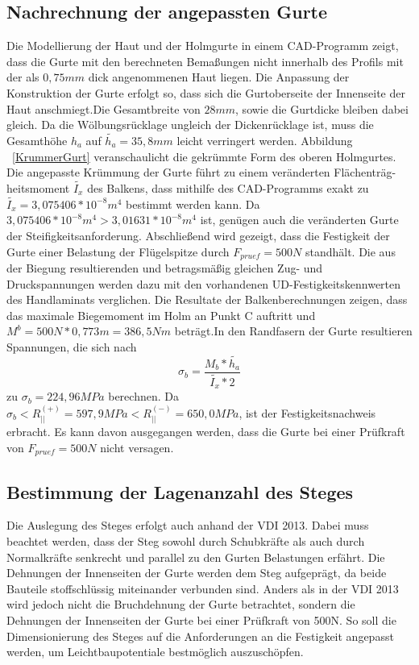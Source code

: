\subsection{Nachrechnung der angepassten Gurte}
 Die Modellierung der Haut und der Holmgurte in einem CAD-Programm zeigt, dass die Gurte mit den berechneten Bemaßungen nicht innerhalb des Profils mit der als $ 0,75mm $ dick angenommenen Haut liegen. Die Anpassung der Konstruktion der Gurte erfolgt so, dass sich die Gurtoberseite der Innenseite der Haut anschmiegt.Die Gesamtbreite von $ 28mm $, sowie die Gurtdicke bleiben dabei gleich. Da die Wölbungsrücklage ungleich der Dickenrücklage ist, muss die Gesamthöhe $ h_{a} $ auf $ \tilde{h_{a}}=35,8mm $ leicht verringert werden. Abbildung ~\ref{KrummerGurt} veranschaulicht die gekrümmte Form des oberen Holmgurtes.\\
 
\noindent Die angepasste Krümmung der Gurte führt zu einem veränderten Flächenträg-heitsmoment $ \tilde{I_{x}} $ des Balkens, dass mithilfe des CAD-Programms exakt zu $ \tilde{I_{x}}=3,075406*10^{-8}m^{4} $ bestimmt werden kann. Da $ 3,075406*10^{-8}m^{4} > 3,01631*10^{-8}m^{4} $ ist, genügen auch die veränderten Gurte der Steifigkeitsanforderung. Abschließend wird gezeigt, dass die Festigkeit der Gurte einer Belastung der Flügelspitze durch $ F_{pruef}=500N $ standhält. Die aus der Biegung resultierenden und betragsmäßig gleichen Zug- und Druckspannungen werden dazu mit den vorhandenen UD-Festigkeitskennwerten des Handlaminats verglichen. Die Resultate der Balkenberechnungen zeigen, dass das maximale Biegemoment im Holm an Punkt C auftritt und $ M^{b}=500N*0,773m=386,5Nm $ beträgt.In den Randfasern der Gurte resultieren Spannungen, die sich nach\\
\begin{equation}
	\sigma_{b}=\frac{M_{b}*\tilde{h_{a}}}{\tilde{I_{x}}*2}
\end{equation} 
zu $ \sigma_{b}=224,96MPa $ berechnen. Da $ \sigma_{b}< R^{(+)}_{||}=597,9 MPa < R^{(-)}_{||}=650,0 MPa $, ist der Festigkeitsnachweis erbracht. Es kann davon ausgegangen werden, dass die Gurte bei einer Prüfkraft von $ F_{pruef}=500N $ nicht versagen. \\

\subsection{Bestimmung der Lagenanzahl des Steges}
Die Auslegung des Steges erfolgt auch anhand der VDI 2013. Dabei muss beachtet werden, dass der Steg sowohl durch Schubkräfte als auch durch Normalkräfte senkrecht und parallel zu den Gurten Belastungen erfährt. Die Dehnungen der Innenseiten der Gurte werden dem Steg aufgeprägt, da beide Bauteile stoffschlüssig miteinander verbunden sind. Anders als in der VDI 2013 wird jedoch nicht die Bruchdehnung der Gurte betrachtet, sondern die Dehnungen der Innenseiten der Gurte bei einer Prüfkraft von 500N. So soll die Dimensionierung des Steges auf die Anforderungen an die Festigkeit angepasst werden, um Leichtbaupotentiale bestmöglich auszuschöpfen.
 

  
